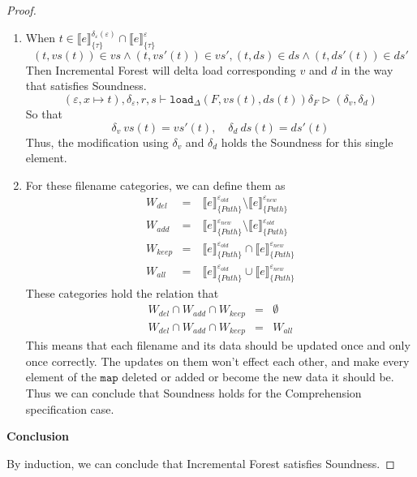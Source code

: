 \documentclass[10pt,twoside,a4paper]{article}
\theoremstyle{theorem}
\theoremstyle{lemma}
\theoremstyle{property}
\theoremstyle{definition}
\theoremstyle{assumption}
\def\newenv{\delta_\varepsilon(\varepsilon)}
\begin{document}
\begin{proof}
\begin{enumerate}
	\item
	When $ t \in \llbracket e \rrbracket^{\newenv}_{\{\tau\}} \cap \llbracket e \rrbracket^{\varepsilon}_{\{\tau\}}$
	\begin{displaymath}
		(t, vs(t)) \in vs \wedge (t, vs'(t)) \in vs', (t, ds) \in ds \wedge (t, ds'(t)) \in ds'
	\end{displaymath}
	Then Incremental Forest will delta load corresponding $v$ and $d$ in the way that satisfies Soundness.
	\begin{displaymath}
		(\varepsilon, x \mapsto t),\delta_\varepsilon, r, s \vdash \mathtt{load}_\Delta(F, vs(t), ds(t)) \delta_F \rhd (\delta_v, \delta_d)
	\end{displaymath}
	So that
	\begin{displaymath}
		\delta_v ~vs(t) = vs'(t), \quad \delta_d ~ds(t) = ds'(t)
	\end{displaymath}
	Thus, the modification using $\delta_v$ and $\delta_d$ holds the Soundness for this single element.

	\item
	For these filename categories, we can define them as
	\begin{eqnarray*}
		W_{del} &=& ~\llbracket e \rrbracket^{\varepsilon_{old}}_{\{Path\}} \setminus \llbracket e \rrbracket^{\varepsilon_{new}}_{\{Path\}}\\
		W_{add} &=& ~\llbracket e \rrbracket^{\varepsilon_{new}}_{\{Path\}} \setminus \llbracket e \rrbracket^{\varepsilon_{old}}_{\{Path\}}\\
		W_{keep} &=& ~\llbracket e \rrbracket^{\varepsilon_{old}}_{\{Path\}} \cap \llbracket e \rrbracket^{\varepsilon_{new}}_{\{Path\}}\\
		W_{all} &=& ~\llbracket e \rrbracket^{\varepsilon_{old}}_{\{Path\}} \cup \llbracket e \rrbracket^{\varepsilon_{new}}_{\{Path\}}
	\end{eqnarray*}
	These categories hold the relation that
	\begin{eqnarray*}
		W_{del} \cap W_{add} \cap W_{keep} &=& \emptyset\\
		W_{del} \cap W_{add} \cap W_{keep} &=& W_{all}
	\end{eqnarray*}
	This means that each filename and its data should be updated once and only once correctly. The updates on them won't effect each other, and make every element of the $\mathtt{map}$ deleted or added or become the new data it should be. Thus we can conclude that Soundness holds for the Comprehension specification case.
	\end{enumerate} 

	\textbf{Conclusion}

	By induction, we can conclude that Incremental Forest satisfies Soundness.
\end{proof}
\end{document}
